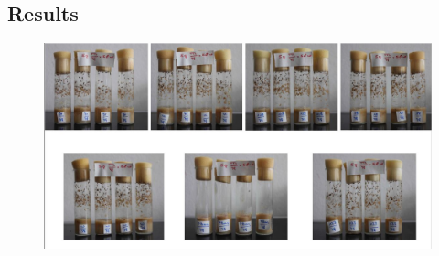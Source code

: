 \documentclass{article}
\begin{document}
\subsection*{Results}

\begin{figure}[H]
	\centering
	\includegraphics[width=1\linewidth]{img/fertility_test_results}
	\caption{}
	\label{fig:fertilitytestresults}
\end{figure}
\end{document}
